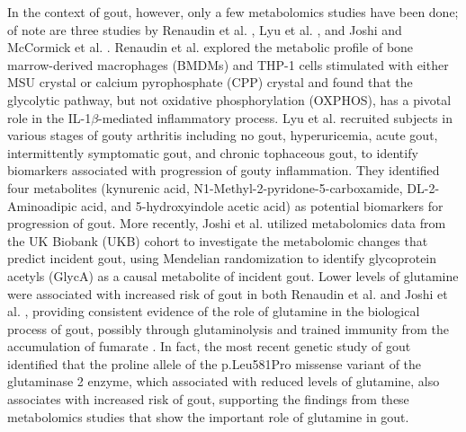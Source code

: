 \documentclass[gucdd,article,submit,pdftex,moreauthors]{Definitions/mdpi}
\begin{document}
In the context of gout, however, only a few metabolomics studies have been done; of note are three studies by Renaudin et al. \citep{renaudin_gout_2020}, Lyu et al. \citep{lyu_metabolomics_2022}, and Joshi and McCormick et al. \citep{joshi_prediagnostic_2023}.
Renaudin et al. \citep{renaudin_gout_2020} explored the metabolic profile of bone marrow-derived macrophages (BMDMs) and THP-1 cells stimulated with either MSU crystal or calcium pyrophosphate (CPP) crystal and found that the glycolytic pathway, but not oxidative phosphorylation (OXPHOS), has a pivotal role in the IL-1$\beta$-mediated inflammatory process.
Lyu et al. \citep{lyu_metabolomics_2022} recruited subjects in various stages of gouty arthritis including no gout, hyperuricemia, acute gout, intermittently symptomatic gout, and chronic tophaceous gout, to identify biomarkers associated with progression of gouty inflammation.
They identified four metabolites (kynurenic acid, N1-Methyl-2-pyridone-5-carboxamide, DL-2-Aminoadipic acid, and 5-hydroxyindole acetic acid) as potential biomarkers for progression of gout.
More recently, Joshi et al. \citep{joshi_prediagnostic_2023} utilized metabolomics data from the UK Biobank (UKB) cohort to investigate the metabolomic changes that predict incident gout, using Mendelian randomization to identify glycoprotein acetyls (GlycA) as a causal metabolite of incident gout.
Lower levels of glutamine were associated with increased risk of gout in both Renaudin et al. \citep{renaudin_gout_2020} and Joshi et al. \citep{joshi_prediagnostic_2023}, providing consistent evidence of the role of glutamine in the biological process of gout, possibly through glutaminolysis and trained immunity from the accumulation of fumarate \citep{arts_glutaminolysis_2016}.
In fact, the most recent genetic study of gout \citep{major_genome-wide_2024} identified that the proline allele of the p.Leu581Pro missense variant of the glutaminase 2 enzyme, which associated with reduced levels of glutamine, also associates with increased risk of gout, supporting the findings from these metabolomics studies that show the important role of glutamine in gout.
\end{document}
